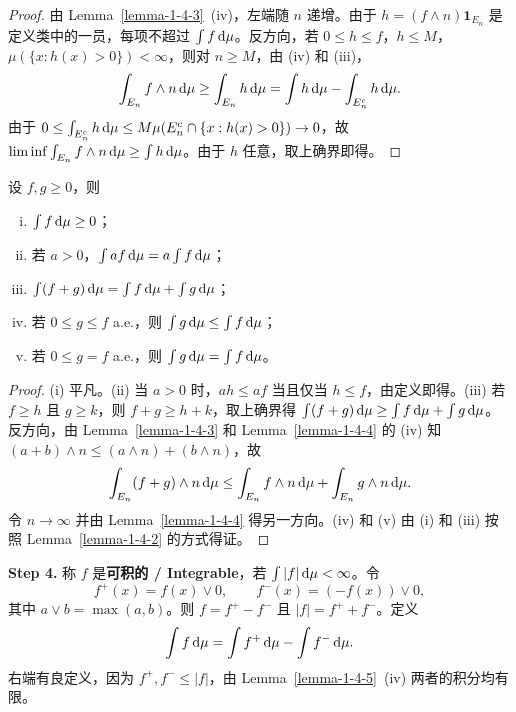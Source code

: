 \begin{proof}
    由 Lemma~\ref{lemma-1-4-3}~(iv)，左端随 $n$ 递增。由于 $h = (f \wedge n) \mathbf{1}_{E_n}$ 是定义类中的一员，每项不超过 $\int f \,\mathrm{d}\mu$。反方向，若 $0 \le h \le f$，$h \le M$，$\mu(\{x:h(x)>0\}) < \infty$，则对 $n \ge M$，由 (iv) 和 (iii)，
    \[
        \int_{E_n} f \wedge n \,\mathrm{d}\mu \ge \int_{E_n} h \,\mathrm{d}\mu = \int h \,\mathrm{d}\mu - \int_{E_n^c} h \,\mathrm{d}\mu.
    \]
    由于 $0 \le \int_{E_n^c} h \,\mathrm{d}\mu \le M \mu(E_n^c \cap \{x : h(x) > 0\}) \to 0$，故 $\liminf \int_{E_n} f \wedge n \,\mathrm{d}\mu \ge \int h \,\mathrm{d}\mu$。由于 $h$ 任意，取上确界即得。
\end{proof}

\begin{lemma}\label{lemma-1-4-5}
    设 $f,g \ge 0$，则
    \begin{enumerate}[(i)]
        \item $\int f \,\mathrm{d}\mu \ge 0$；
        \item 若 $a > 0$，$\int af \,\mathrm{d}\mu = a \int f \,\mathrm{d}\mu$；
        \item $\int (f+g) \,\mathrm{d}\mu = \int f \,\mathrm{d}\mu + \int g \,\mathrm{d}\mu$；
        \item 若 $0 \le g \le f$ a.e.，则 $\int g \,\mathrm{d}\mu \le \int f \,\mathrm{d}\mu$；
        \item 若 $0 \le g = f$ a.e.，则 $\int g \,\mathrm{d}\mu = \int f \,\mathrm{d}\mu$。
    \end{enumerate}
\end{lemma}

\begin{proof}
    (i) 平凡。(ii) 当 $a > 0$ 时，$ah \le af$ 当且仅当 $h \le f$，由定义即得。(iii) 若 $f \ge h$ 且 $g \ge k$，则 $f+g \ge h+k$，取上确界得 $\int(f+g)\,\mathrm{d}\mu \ge \int f\,\mathrm{d}\mu + \int g\,\mathrm{d}\mu$。反方向，由 Lemma~\ref{lemma-1-4-3} 和 Lemma~\ref{lemma-1-4-4} 的 (iv) 知 $(a+b) \wedge n \le (a \wedge n) + (b \wedge n)$，故
    \[
        \int_{E_n} (f+g) \wedge n \,\mathrm{d}\mu \le \int_{E_n} f \wedge n \,\mathrm{d}\mu + \int_{E_n} g \wedge n \,\mathrm{d}\mu.
    \]
    令 $n \to \infty$ 并由 Lemma~\ref{lemma-1-4-4} 得另一方向。(iv) 和 (v) 由 (i) 和 (iii) 按照 Lemma~\ref{lemma-1-4-2} 的方式得证。
\end{proof}

\medskip\noindent\textbf{Step 4.} 称 $f$ 是{\normalfont\bfseries 可积的 / Integrable}，若 $\int |f| \,\mathrm{d}\mu < \infty$。令
\[
    f^+(x) = f(x) \vee 0, \qquad f^-(x) = (-f(x)) \vee 0,
\]
其中 $a \vee b = \max(a,b)$。则 $f = f^+ - f^-$ 且 $|f| = f^+ + f^-$。定义
\[
    \int f \,\mathrm{d}\mu = \int f^+ \,\mathrm{d}\mu - \int f^- \,\mathrm{d}\mu.
\]
右端有良定义，因为 $f^+, f^- \le |f|$，由 Lemma~\ref{lemma-1-4-5}~(iv) 两者的积分均有限。

